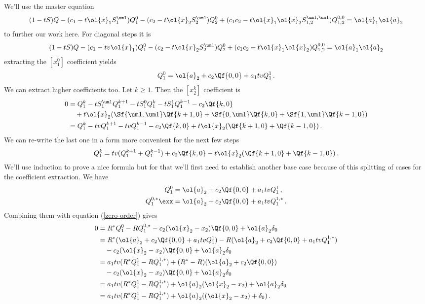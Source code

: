 We'll use the master equation
\begin{align}
(1-tS)Q - (c_1-t\ol{x}_1S_1^{\um 1}) Q_1^0- (c_2-t\ol{x}_2S_2^{\um 1}) Q_2^0+ (c_1c_2-t\ol{x}_1\ol{x}_2S_{1,2}^{\um 1,\um 1})Q_{1,2}^{0,0}  = \ol{a}_1\ol{a}_2
\end{align}
to further our work here. For diagonal steps it is
\begin{align}
 (1-tS)Q - (c_1-tv\ol{x}_1) Q_1^0- (c_2-t\ol{x}_2S_2^{\um 1}) Q_2^0+ (c_1c_2-t\ol{x}_1\ol{x}_2)Q_{1,2}^{0,0}  = \ol{a}_1\ol{a}_2
\end{align}
extracting the $[x_1^0]$ coefficient yields
\begin{align}
   Q_1^0 =  \ol{a}_2+c_2\Qf{0,0} + a_1tvQ_1^1\,.
\end{align}
We can extract higher coefficients too. Let $k\geq 1$. Then the $[x_2^k]$ coefficient is
\begin{align}\begin{split}
	0 &= Q_1^k-tS_{1}^{\um 1}Q_1^{k+1}-tS_1^{0}Q_1^k-tS_1^1Q_1^{k-1}-c_2\Qf{k,0} \\ 
	   &\quad+ t\ol{x}_2(\Sf{\um 1,\um 1}\Qf{k+1,0}+\Sf{0,\um 1}\Qf{k,0}+\Sf{1,\um 1}\Qf{k-1,0})\\
	   &=Q_1^k-tvQ_1^{k+1}-tvQ_1^{k-1}-c_2\Qf{k,0} + t\ol{x}_2(\Qf{k+1,0}+\Qf{k-1,0})\,.
\end{split}\end{align}
We can re-write the last one in a form more convenient for the next few steps
\begin{align}\label{formula}
	Q_1^k = tv(Q_1^{k+1}+Q_1^{k-1}) + c_2 \Qf{k,0} - t\ol{x}_2(\Qf{k+1,0}+\Qf{k-1,0})\,.
\end{align}
We'll use induction to prove a nice formula but for that we'll first need to establish another base case because of this splitting of cases for the coefficient extraction. We have
\begin{align}
	Q_1^0 &=  \ol{a}_2+c_2\Qf{0,0} + a_1tvQ_1^1\,,\\
	Q_1^{0,\ast} \exx&=  \ol{a}_2+c_2\Qf{0,0} + a_1tvQ_1^{1,\ast}\,.
\end{align}
Combining them with equation (\ref{zero-order}) gives
\begin{align}
\begin{split}
        0 &= R^\ast Q_1^0 -R Q_1^{0,\ast} - c_2(\ol{x}_2-x_2)\Qf{0,0} + \ol{a}_2\delta_0 \\
	&= R^\ast (  \ol{a}_2+c_2\Qf{0,0} + a_1tvQ_1^1) -R ( \ol{a}_2+c_2\Qf{0,0} + a_1tvQ_1^{1,\ast}) \\
	&\quad- c_2(\ol{x}_2-x_2)\Qf{0,0} + \ol{a}_2\delta_0\\
	&=a_1tv(R^\ast Q_1^1-R Q_1^{1,\ast}) + (R^\ast-R)( \ol{a}_2+c_2\Qf{0,0}) \\
	&\quad- c_2(\ol{x}_2-x_2)\Qf{0,0} + \ol{a}_2\delta_0\\
	& =a_1tv(R^\ast Q_1^1-R Q_1^{1,\ast})+ \ol{a}_2(\ol{x}_2-x_2)+ \ol{a}_2\delta_0\\
	& =a_1tv(R^\ast Q_1^1-R Q_1^{1,\ast})+ \ol{a}_2((\ol{x}_2-x_2)+\delta_0)\,.
\end{split}
\end{align}
